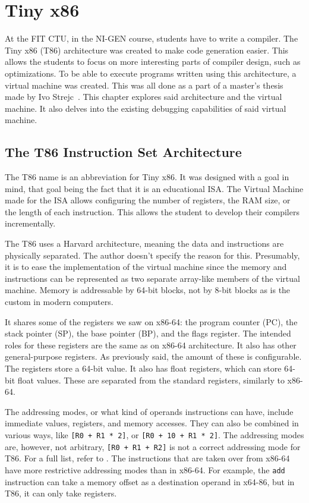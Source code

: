 \chapter{Tiny x86}\label{section:T86}
At the FIT CTU, in the NI-GEN course, students have to write a compiler. The
Tiny x86 (T86) architecture was created to make code generation easier. This
allows the students to focus on more interesting parts of compiler design, such
as optimizations. To be able to execute programs written using this
architecture, a virtual machine was created. This was all done as a part of a
master's thesis made by Ivo Strejc~\cite{ivo2021tiny}. This chapter explores
said architecture and the virtual machine. It also delves into the existing
debugging capabilities of said virtual machine.

\section{The T86 Instruction Set Architecture}
The T86 name is an abbreviation for Tiny x86. It was designed with a goal in
mind, that goal being the fact that it is an educational ISA. The Virtual
Machine made for the ISA allows configuring the number of registers, the RAM
size, or the length of each instruction. This allows the student to develop
their compilers incrementally.

The T86 uses a Harvard architecture, meaning the data and instructions are
physically separated. The author doesn't specify the reason for this.
Presumably, it is to ease the implementation of the virtual machine since the
memory and instructions can be represented as two separate array-like members
of the virtual machine. Memory is addressable by 64-bit blocks, not by 8-bit
blocks as is the custom in modern computers.

It shares some of the registers we saw on x86-64: the program counter (PC), the
stack pointer (SP), the base pointer (BP), and the flags register. The intended
roles for these registers are the same as on x86-64 architecture. It also has
other general-purpose registers. As previously said, the amount of these is
configurable. The registers store a 64-bit value. It also has float registers,
which can store 64-bit float values. These are separated from the standard
registers, similarly to x86-64.

The addressing modes, or what kind of operands instructions can have, include
immediate values, registers, and memory accesses. They can also be combined in
various ways, like \texttt{[R0 + R1 * 2]}, or \texttt{[R0 + 10 + R1 * 2]}. The
addressing modes are, however, not arbitrary, \texttt{[R0 + R1 + R2]} is not a
correct addressing mode for T86. For a full list, refer to \cite{ivo2021tiny}.
The instructions that are taken over from x86-64 have more restrictive
addressing modes than in x86-64. For example, the \verb|add| instruction can
take a memory offset as a destination operand in x64-86, but in T86, it can
only take registers.

